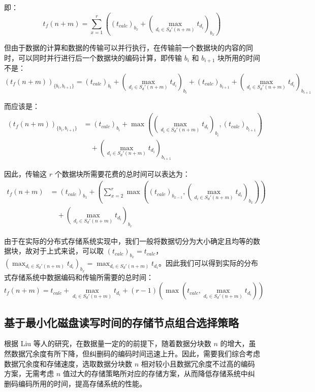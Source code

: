 即：
\begin{equation}
t_{f}(n+m)=\sum_{x=1}^{r}\left((t_{calc})_{b_{x}}+\left(\max_{d_{i}{\in}S_{d}'(n+m)}t_{d_i}\right)_{b_{x}}\right)
\end{equation}

但由于数据的计算和数据的传输可以并行执行，在传输前一个数据块的内容的同时，可以同时并行进行后一个数据块的编码计算，即传输 $b_{i}$ 和 $b_{i+1}$ 块所用的时间不是：
\begin{equation}
\left(t_{f}(n+m)\right)_{\{b_{i},b_{i+1}\}}=(t_{calc})_{b_{i}}+\left(\max_{d_{i}{\in}S_{d}'(n+m)}t_{d_i}\right)_{b_{i}}+(t_{calc})_{b_{i+1}}+\left(\max_{d_{i}{\in}S_{d}'(n+m)}t_{d_i}\right)_{b_{i+1}}
\end{equation}

而应该是：
\begin{equation}
\begin{split}
\left(t_{f}(n+m)\right)_{\{b_{i},b_{i+1}\}}&=(t_{calc})_{b_{i}}+\max\left(\left(\max_{d_{i}{\in}S_{d}'(n+m)}t_{d_i}\right)_{b_{i}},(t_{calc})_{b_{i+1}}\right)\\
&\quad+\left(\max_{d_{i}{\in}S_{d}'(n+m)}t_{d_i}\right)_{b_{i+1}}
\end{split}
\end{equation}

因此，传输这 $r$ 个数据块所需要花费的总时间可以表达为：
\begin{equation}
\begin{split}
t_{f}(n+m)&=(t_{calc})_{b_1}+\left(\sum_{x=2}^{r}\max\left((t_{calc})_{b_{x-1}},\left(\max_{d_{i}{\in}S_{d}'(n+m)}t_{d_i}\right)_{b_{x}}\right)\right)\\
&\quad+\left(\max_{d_{i}{\in}S_{d}'(n+m)}t_{d_i}\right)_{b_r}
\end{split}
\end{equation}

由于在实际的分布式存储系统实现中，我们一般将数据切分为大小确定且均等的数据块，故对于上式来说，可以取 $(t_{calc})_{b_x}=t_{calc}$，$\left(\displaystyle\max_{d_{i}{\in}S_{d}'(n+m)}t_{d_i}\right)_{b_{x}}=\displaystyle\max_{d_{i}{\in}S_{d}'(n+m)}t_{d_i}$。因此我们可以得到实际的分布式存储系统中数据编码和传输所需要的总时间：
\begin{equation}
t_{f}(n+m)=t_{calc}+\max_{d_{i}{\in}S_{d}'(n+m)}t_{d_i}+(r-1)\left(\max\left(t_{calc},\max_{d_{i}{\in}S_{d}'(n+m)}t_{d_i}\right)\right)
\end{equation}
\subsection{基于最小化磁盘读写时间的存储节点组合选择策略}
根据 Liu 等人的研究\cite{liu2018implementation}，在数据量一定的的前提下，随着数据分块数 $n$ 的增大，虽然数据冗余度有所下降，但纠删码的编码时间迅速上升。因此，需要我们综合考虑数据冗余度和存储速度，选取数据分块数 $n$ 相对较小且数据冗余度不过高的编码方案，无需考虑 $n$ 值过大的存储策略所对应的存储方案，从而降低存储系统中纠删码编码所用的时间，提高存储系统的性能。


